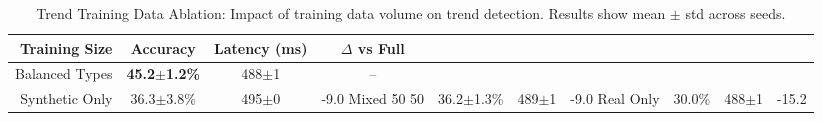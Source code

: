 
\begin{table}[t]
\centering
\caption{Trend Training Data Ablation: Impact of training data volume on trend detection.
Results show mean $\pm$ std across seeds.}
\label{tab:trend_ablation}
\begin{tabular}{r c c c}
\toprule
\textbf{Training Size} & \textbf{Accuracy} & \textbf{Latency (ms)} & \textbf{$\Delta$ vs Full} \\
\midrule
Balanced Types & \textbf{45.2$\pm$1.2\%} & 488$\pm$1 & -- \\
Synthetic Only & 36.3$\pm$3.8\% & 495$\pm$0 & -9.0%
Mixed 50 50 & 36.2$\pm$1.3\% & 489$\pm$1 & -9.0%
Real Only & 30.0\% & 488$\pm$1 & -15.2%

\bottomrule
\end{tabular}
\end{table}
